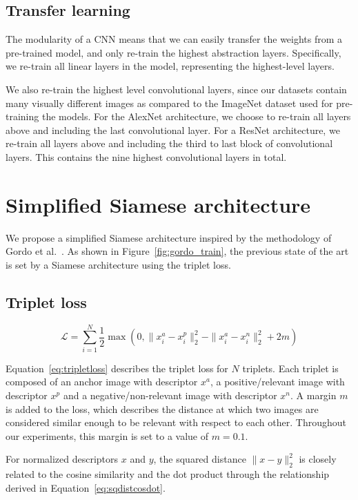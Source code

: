 \subsection{Transfer learning}
The modularity of a CNN means that we can easily transfer
the weights from a pre-trained model, and only re-train the highest
abstraction layers. Specifically, we re-train all linear layers in the
model, representing the highest-level layers.

We also re-train the highest level convolutional layers, since our datasets
contain many visually different images as compared to the ImageNet
dataset used for pre-training the models.
For the AlexNet architecture, we choose to re-train all layers above
and including the last convolutional layer.
For a ResNet architecture, we re-train all layers above and including the
third to last block of convolutional layers. This contains the
nine highest convolutional layers in total.

\section{Simplified Siamese architecture}\label{sec:simplifiedsiam}
We propose a simplified Siamese architecture inspired by the methodology
of Gordo et al.~\cite{gordo_deep_2016}. As shown in
Figure~\ref{fig:gordo_train}, the previous state of the art is set
by a Siamese architecture using the triplet loss.

\subsection{Triplet loss}\label{sec:tripletloss}
\begin{equation}\label{eq:tripletloss}
\mathcal{L} = \sum_{i=1}^N \frac{1}{2}
\max(0, \|x^a_i - x^p_i\|_2^2 - \|x^a_i - x^n_i\|_2^2 + 2m)
\end{equation}

Equation~\ref{eq:tripletloss} describes the triplet loss for $N$
triplets. Each triplet is composed of an anchor image with descriptor
$x^a$, a positive/relevant image with descriptor $x^p$ and a
negative/non-relevant image with descriptor $x^n$. A margin $m$ is added
to the loss, which describes the distance at which two images are
considered similar enough to be relevant with respect to each other.
Throughout our experiments, this margin is set to a value of $m=0.1$.

For normalized descriptors $x$ and $y$, the squared distance $\| x - y \|_2^2$
is closely related to the cosine similarity and the dot product through
the relationship derived in Equation~\ref{eq:sqdistcosdot}.


